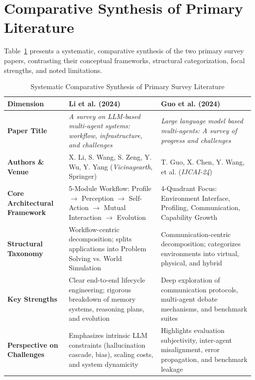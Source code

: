 \documentclass[12pt,a4paper]{report}
\begin{document}
\section{Comparative Synthesis of Primary Literature}
Table~\ref{tab:lit_comparison} presents a systematic, comparative synthesis of the two primary survey papers, contrasting their conceptual frameworks, structural categorization, focal strengths, and noted limitations.

\begin{table}[htbp]
\centering
\small
\caption{Systematic Comparative Synthesis of Primary Survey Literature}
\label{tab:lit_comparison}
\begin{tabularx}{\textwidth}{p{3.2cm}X X}
\toprule
\textbf{Dimension} & \textbf{Li et al. (2024) \cite{li2024survey}} & \textbf{Guo et al. (2024) \cite{guo2024large}} \\
\midrule
\textbf{Paper Title} & \textit{A survey on LLM-based multi-agent systems: workflow, infrastructure, and challenges} & \textit{Large language model based multi-agents: A survey of progress and challenges} \\
\addlinespace
\textbf{Authors \& Venue} & X. Li, S. Wang, S. Zeng, Y. Wu, Y. Yang (\textit{Vicinagearth}, Springer) & T. Guo, X. Chen, Y. Wang, et al. (\textit{IJCAI-24}) \\
\addlinespace
\textbf{Core Architectural Framework} & 5-Module Workflow: Profile $\rightarrow$ Perception $\rightarrow$ Self-Action $\rightarrow$ Mutual Interaction $\rightarrow$ Evolution & 4-Quadrant Focus: Environment Interface, Profiling, Communication, Capability Growth \\
\addlinespace
\textbf{Structural Taxonomy} & Workflow-centric decomposition; splits applications into Problem Solving vs. World Simulation & Communication-centric decomposition; categorizes environments into virtual, physical, and hybrid \\
\addlinespace
\textbf{Key Strengths} & Clear end-to-end lifecycle engineering; rigorous breakdown of memory systems, reasoning plans, and evolution & Deep exploration of communication protocols, multi-agent debate mechanisms, and benchmark suites \\
\addlinespace
\textbf{Perspective on Challenges} & Emphasizes intrinsic LLM constraints (hallucination cascade, bias), scaling costs, and system dynamicity & Highlights evaluation subjectivity, inter-agent misalignment, error propagation, and benchmark leakage \\
\bottomrule
\end{tabularx}
\end{table}
\end{document}
